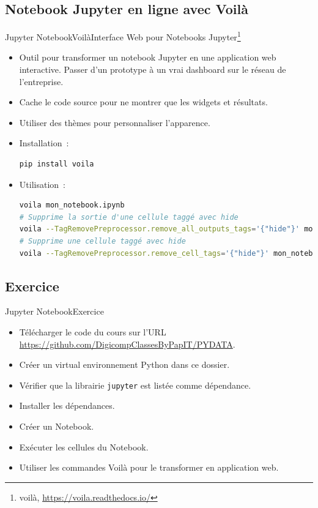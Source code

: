 \documentclass{beamer}
\begin{document}
    \subsection{Notebook Jupyter en ligne avec Voilà}
    \begin{frame}[fragile]{Jupyter Notebook}{Voilà}{Interface Web pour Notebooks Jupyter\footnote{voilà, \url{https://voila.readthedocs.io/}}}
        \begin{itemize}
            \item Outil pour transformer un notebook Jupyter en une application web interactive.
            Passer d'un prototype à un vrai dashboard sur le réseau de l'entreprise.
            \item Cache le code source pour ne montrer que les widgets et résultats.
            \item Utiliser des thèmes pour personnaliser l'apparence.
            \item Installation~:
            \begin{lstlisting}[language=bash,basicstyle=\tiny\ttfamily]
pip install voila
            \end{lstlisting}
            \item Utilisation~:
            \begin{lstlisting}[language=bash,basicstyle=\tiny\ttfamily]
voila mon_notebook.ipynb
# Supprime la sortie d'une cellule taggé avec hide
voila --TagRemovePreprocessor.remove_all_outputs_tags='{"hide"}' mon_notebook.ipynb
# Supprime une cellule taggé avec hide
voila --TagRemovePreprocessor.remove_cell_tags='{"hide"}' mon_notebook.ipynb
            \end{lstlisting}
        \end{itemize}
    \end{frame}

    \subsection{Exercice}\label{jupyter-exercice}
    \begin{frame}{Jupyter Notebook}{Exercice \execcounterdispinc{}}
        \begin{itemize}
            \item Télécharger le code du cours sur l'URL \url{https://github.com/DigicompClassesByPapIT/PYDATA}.
            \item Créer un virtual environnement Python dans ce dossier.
            \item Vérifier que la librairie \lstinline{jupyter} est listée comme dépendance.
            \item Installer les dépendances.
            \item Créer un Notebook.
            \item Exécuter les cellules du Notebook.
            \item Utiliser les commandes Voilà pour le transformer en application web.
        \end{itemize}
    \end{frame}
\end{document}
